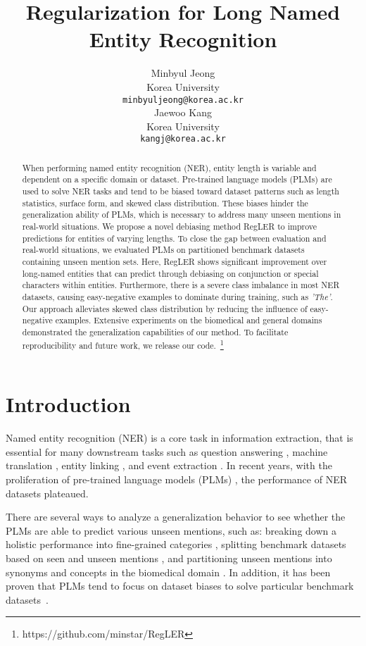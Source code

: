 \documentclass[11pt]{article}
\title{Regularization for Long 
Named Entity Recognition}
\author{Minbyul Jeong \\
  Korea University \\
  \texttt{minbyuljeong@korea.ac.kr} \\\And
  Jaewoo Kang \\
  Korea University \\
  \texttt{kangj@korea.ac.kr} \\}
\begin{document}
\maketitle
\begin{abstract}
When performing named entity recognition (NER), entity length is variable and dependent on a specific domain or dataset.
Pre-trained language models (PLMs) are used to solve NER tasks and tend to be biased toward dataset patterns such as length statistics, surface form, and skewed class distribution.
These biases hinder the generalization ability of PLMs, which is necessary to address many unseen mentions in real-world situations.
We propose a novel debiasing method RegLER to improve predictions for entities of varying lengths.
To close the gap between evaluation and real-world situations, we evaluated PLMs on partitioned benchmark datasets containing unseen mention sets.
Here, RegLER shows significant improvement over long-named entities that can predict through debiasing on conjunction or special characters within entities.
Furthermore, there is a severe class imbalance in most NER datasets, causing easy-negative examples to dominate during training, such as \textit{'The'}.
Our approach alleviates skewed class distribution by reducing the influence of easy-negative examples.
Extensive experiments on the biomedical and general domains demonstrated the generalization capabilities of our method.
To facilitate reproducibility and future work, we release our code.~\footnote{https://github.com/minstar/RegLER}
\end{abstract}

\section{Introduction}

Named entity recognition (NER) is a core task in information extraction, that is essential for many downstream tasks such as question answering \cite{molla2006named,lee-etal-2020-answering}, machine translation \cite{babych2003improving,ugawa2018neural}, entity linking \cite{martins-etal-2019-joint}, and event extraction \cite{wadden2019entity}.
In recent years, with the proliferation of pre-trained language models (PLMs) \cite{devlin2019bert,liu2019roberta,lee2020biobert}, the performance of NER datasets plateaued.

There are several ways to analyze a generalization behavior to see whether the PLMs are able to predict various unseen mentions, such as: breaking down a holistic performance into fine-grained categories \cite{fu-etal-2020-interpretable,fu2020rethinking}, splitting benchmark datasets based on seen and unseen mentions \cite{lin2020rigourous}, and partitioning unseen mentions into synonyms and concepts in the biomedical domain \cite{kim2021your}.
In addition, it has been proven that PLMs tend to focus on dataset biases to solve particular benchmark datasets~\cite{jia2017adversarial,gururangan2018annotation,nie2020adversarial}.
\end{document}
